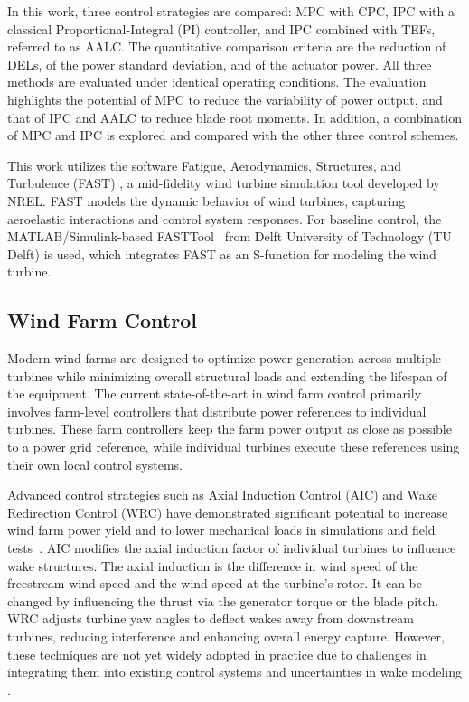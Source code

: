 In this work, three control strategies are compared: MPC with CPC, IPC with a classical Proportional-Integral (PI) controller, and IPC combined with TEFs, referred to as AALC. The quantitative comparison criteria are the reduction of DELs, of the power standard deviation, and of the actuator power. All three methods are evaluated under identical operating conditions. The evaluation highlights the potential of MPC to reduce the variability of power output, and that of IPC and AALC to reduce blade root moments. In addition, a combination of MPC and IPC is explored and compared with the other three control schemes.

This work utilizes the software Fatigue, Aerodynamics, Structures, and Turbulence (FAST) \cite{jonkman2005fast}, a mid-fidelity wind turbine simulation tool developed by NREL. FAST models the dynamic behavior of wind turbines, capturing aeroelastic interactions and control system responses. For baseline control, the MATLAB/Simulink-based FASTTool~\cite{mulders2020wind} from Delft University of Technology (TU Delft) is used, which integrates FAST as an S-function for modeling the wind turbine.


\subsection{Wind Farm Control}
Modern wind farms are designed to optimize power generation across multiple turbines while minimizing overall structural loads and extending the lifespan of the equipment. The current state-of-the-art in wind farm control primarily involves farm-level controllers that distribute power references to individual turbines. These farm controllers keep the farm power output as close as possible to a power grid reference, while individual turbines execute these references using their own local control systems. 

Advanced control strategies such as Axial Induction Control (AIC) and Wake Redirection Control (WRC) have demonstrated significant potential to increase wind farm power yield and to lower mechanical loads in simulations and field tests~\cite{houck2022review}. AIC modifies the axial induction factor of individual turbines to influence wake structures. The axial induction is the difference in wind speed of the freestream wind speed and the wind speed at the turbine's rotor. It can be changed by influencing the thrust via the generator torque or the blade pitch. WRC adjusts turbine yaw angles to deflect wakes away from downstream turbines, reducing interference and enhancing overall energy capture. However, these techniques are not yet widely adopted in practice due to challenges in integrating them into existing control systems and uncertainties in wake modeling \cite{andersson2021wind, houck2022review}.

